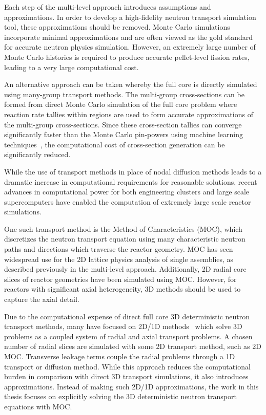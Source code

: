 Each step of the multi-level approach introduces assumptions and approximations. In order to develop a high-fidelity neutron transport simulation tool, these approximations should be removed. Monte Carlo simulations incorporate minimal approximations and are often viewed as the gold standard for accurate neutron physics simulation. However, an extremely large number of Monte Carlo histories is required to produce accurate pellet-level fission rates, leading to a very large computational cost.

An alternative approach can be taken whereby the full core is directly simulated using many-group transport methods. The multi-group cross-sections can be formed from direct Monte Carlo simulation of the full core problem where reaction rate tallies within regions are used to form accurate approximations of the multi-group cross-sections. Since these cross-section tallies can converge significantly faster than the Monte Carlo pin-powers using machine learning techniques~\cite{boyd2017thesis}, the computational cost of cross-section generation can be significantly reduced. 

While the use of transport methods in place of nodal diffusion methods leads to a dramatic increase in computational requirements for reasonable solutions, recent advances in computational power for both engineering clusters and large scale supercomputers have enabled the computation of extremely large scale reactor simulations. 

One such transport method is the Method of Characteristics (\ac{MOC}), which discretizes the neutron transport equation using many characteristic neutron paths and directions which traverse the reactor geometry. \ac{MOC} has seen widespread use for the 2D lattice physics analysis of single assemblies, as described previously in the multi-level approach. Additionally, 2D radial core slices of reactor geometries have been simulated using \ac{MOC}. However, for reactors with significant axial heterogeneity, 3D methods should be used to capture the axial detail. 

Due to the computational expense of direct full core 3D deterministic neutron transport methods, many have focused on 2D/1D methods~\cite{2d1d,liu2d1d, tang2d1d, collins2d1d, jarrett2d1d, wenbin2d1d} which solve 3D problems as a coupled system of radial and axial transport problems. A chosen number of radial slices are simulated with some 2D transport method, such as 2D \ac{MOC}. Transverse leakage terms couple the radial problems through a 1D transport or diffusion method. While this approach reduces the computational burden in comparison with direct 3D transport simulations, it also introduces approximations. Instead of making such 2D/1D approximations, the work in this thesis focuses on explicitly solving the 3D deterministic neutron transport equations with \ac{MOC}.


